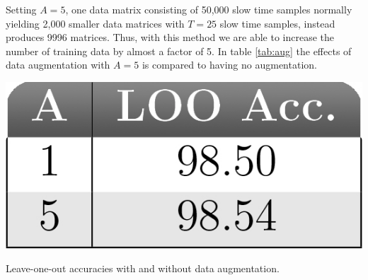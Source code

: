 Setting $A=5$, one data matrix consisting of 50,000 slow time samples normally yielding 2,000 smaller data matrices with $T=25$ slow time samples, instead produces 9996 matrices. Thus, with this method we are able to increase the number of training data by almost a factor of 5. In table \ref{tab:aug} the effects of data augmentation with $A=5$ is compared to having no augmentation.

\begin{table}
	\begin{center}
		\includegraphics[scale=0.7]{figs_temp/table_augmentation.jpg}
	\end{center}
	\caption{Leave-one-out accuracies with and without data augmentation.}
	\label{tab:aug}
\end{table}

